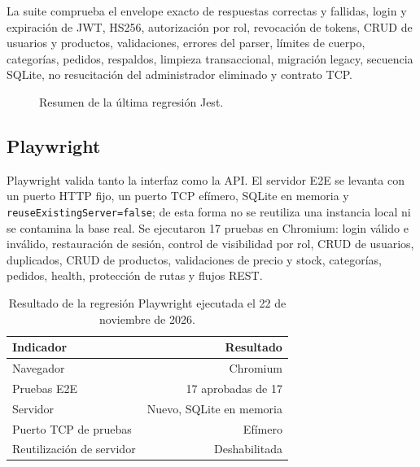\documentclass[12pt,a4paper]{article}
\begin{document}
La suite comprueba el envelope exacto de respuestas correctas y fallidas, login y expiración de JWT, HS256, autorización por rol, revocación de tokens, CRUD de usuarios y productos, validaciones, errores del parser, límites de cuerpo, categorías, pedidos, respaldos, limpieza transaccional, migración legacy, secuencia SQLite, no resucitación del administrador eliminado y contrato TCP.

\begin{figure}[H]
  \centering
  \caption{Resumen de la última regresión Jest.}
  \label{fig:jest}
\end{figure}

\subsection{Playwright}

Playwright valida tanto la interfaz como la API. El servidor E2E se levanta con un puerto HTTP fijo, un puerto TCP efímero, SQLite en memoria y \texttt{reuseExistingServer=false}; de esta forma no se reutiliza una instancia local ni se contamina la base real. Se ejecutaron 17 pruebas en Chromium: login válido e inválido, restauración de sesión, control de visibilidad por rol, CRUD de usuarios, duplicados, CRUD de productos, validaciones de precio y stock, categorías, pedidos, health, protección de rutas y flujos REST.

\begin{table}[H]
  \centering
  \caption{Resultado de la regresión Playwright ejecutada el 22 de noviembre de 2026.}
  \begin{tabular}{l r}
    \toprule
    Indicador & Resultado \\
    \midrule
    Navegador & Chromium \\
    Pruebas E2E & 17 aprobadas de 17 \\
    Servidor & Nuevo, SQLite en memoria \\
    Puerto TCP de pruebas & Efímero \\
    Reutilización de servidor & Deshabilitada \\
    \bottomrule
  \end{tabular}
\end{table}
\end{document}
